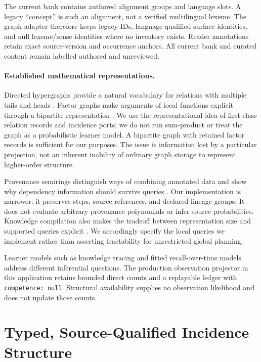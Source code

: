 \documentclass{article}
\begin{document}
The current bank contains \GraphAlignments{} authored alignment groups and \GraphTermSlots{} language slots. A legacy ``concept'' is such an alignment, not a verified multilingual lexeme. The graph adapter therefore keeps legacy IDs, language-qualified surface identities, and null lexeme/sense identities where no inventory exists. Reader annotations retain exact source-version and occurrence anchors. All current bank and curated content remain labelled authored and unreviewed.

\paragraph{Established mathematical representations.}
Directed hypergraphs provide a natural vocabulary for relations with multiple tails and heads \citep{gallo1993directed}. Factor graphs make arguments of local functions explicit through a bipartite representation \citep{kschischang2001factor}. We use the representational idea of first-class relation records and incidence ports; we do not run sum-product or treat the graph as a probabilistic learner model. A bipartite graph with retained factor records is sufficient for our purposes. The issue is information lost by a particular projection, not an inherent inability of ordinary graph storage to represent higher-order structure.

Provenance semirings distinguish ways of combining annotated data and show why dependency information should survive queries \citep{green2007provenance}. Our implementation is narrower: it preserves steps, source references, and declared lineage groups. It does not evaluate arbitrary provenance polynomials or infer source probabilities. Knowledge compilation also makes the tradeoff between representation size and supported queries explicit \citep{darwiche2002knowledge}. We accordingly specify the local queries we implement rather than asserting tractability for unrestricted global planning.

Learner models such as knowledge tracing \citep{corbett1994knowledge} and fitted recall-over-time models \citep{settles2016trainable} address different inferential questions. The production observation projector in this application retains bounded direct counts and a replayable ledger with \texttt{competence: null}. Structural availability supplies no observation likelihood and does not update those counts.

\section{Typed, Source-Qualified Incidence Structure}
\label{sec:representation}
\end{document}
